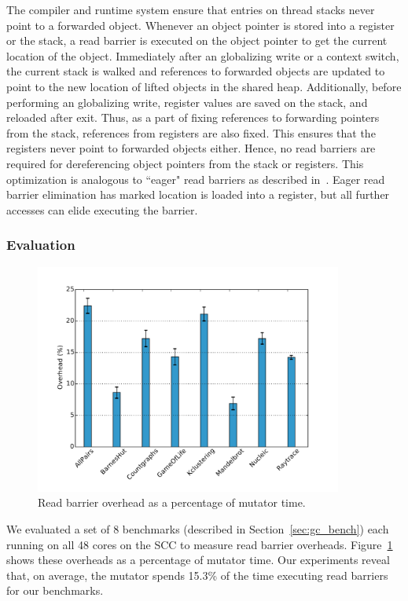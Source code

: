 The compiler and runtime system ensure that entries on thread stacks never
point to a forwarded object. Whenever an object pointer is stored into a
register or the stack, a read barrier is executed on the object pointer to get
the current location of the object. Immediately after an globalizing write or a
context switch, the current stack is walked and references to forwarded objects
are updated to point to the new location of lifted objects in the shared heap.
Additionally, before performing an globalizing write, register values are saved
on the stack, and reloaded after exit. Thus, as a part of fixing references to
forwarding pointers from the stack, references from registers are also fixed.
This ensures that the registers never point to forwarded objects either. Hence,
no read barriers are required for dereferencing object pointers from the stack
or registers. This optimization is analogous to ``eager" read barriers as
described in~\cite{Bacon03}. Eager read barrier elimination has marked
location is loaded into a register, but all further accesses can elide
executing the barrier.

\subsubsection{Evaluation}

\begin{figure}[t]
  \centering
  \includegraphics[width=0.9\textwidth]{Graphs/RB_overhead}
	\caption{Read barrier overhead as a percentage of mutator time.}
  \label{fig:rb-overhead}
\end{figure}

We evaluated a set of 8 benchmarks (described in Section~\ref{sec:gc_bench})
each running on all 48 cores on the SCC to measure read barrier overheads.
Figure~\ref{fig:rb-overhead} shows these overheads as a percentage of mutator
time. Our experiments reveal that, on average, the mutator spends 15.3\% of the
time executing read barriers for our benchmarks.

